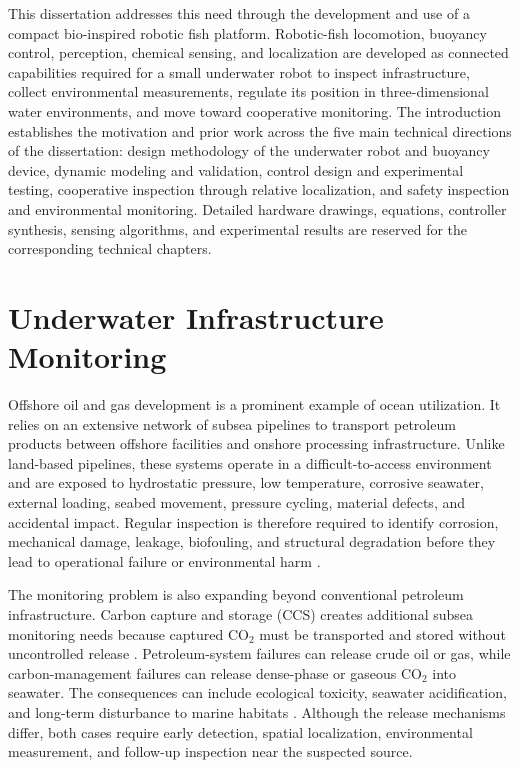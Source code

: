 \documentclass{uhcoethesis}
\begin{document}
This dissertation addresses this need through the development and use of a compact bio-inspired robotic fish platform. Robotic-fish locomotion, buoyancy control, perception, chemical sensing, and localization are developed as connected capabilities required for a small underwater robot to inspect infrastructure, collect environmental measurements, regulate its position in three-dimensional water environments, and move toward cooperative monitoring. The introduction establishes the motivation and prior work across the five main technical directions of the dissertation: design methodology of the underwater robot and buoyancy device, dynamic modeling and validation, control design and experimental testing, cooperative inspection through relative localization, and safety inspection and environmental monitoring. Detailed hardware drawings, equations, controller synthesis, sensing algorithms, and experimental results are reserved for the corresponding technical chapters.

\section{Underwater Infrastructure Monitoring}

Offshore oil and gas development is a prominent example of ocean utilization. It relies on an extensive network of subsea pipelines to transport petroleum products between offshore facilities and onshore processing infrastructure. Unlike land-based pipelines, these systems operate in a difficult-to-access environment and are exposed to hydrostatic pressure, low temperature, corrosive seawater, external loading, seabed movement, pressure cycling, material defects, and accidental impact. Regular inspection is therefore required to identify corrosion, mechanical damage, leakage, biofouling, and structural degradation before they lead to operational failure or environmental harm \cite{Ho2020,Shukla2016,Mcleod2012,Patel2024}.

The monitoring problem is also expanding beyond conventional petroleum infrastructure. Carbon capture and storage (CCS) creates additional subsea monitoring needs because captured \mbox{CO$_2$} must be transported and stored without uncontrolled release \cite{Herzog2001,Yadav2022,Osman2021}. Petroleum-system failures can release crude oil or gas, while carbon-management failures can release dense-phase or gaseous \mbox{CO$_2$} into seawater. The consequences can include ecological toxicity, seawater acidification, and long-term disturbance to marine habitats \cite{Filonchyk2024,Kabir2023,Zheng2021,Mortezaei2021,Queiros2014,Pham2016}. Although the release mechanisms differ, both cases require early detection, spatial localization, environmental measurement, and follow-up inspection near the suspected source.
\end{document}
